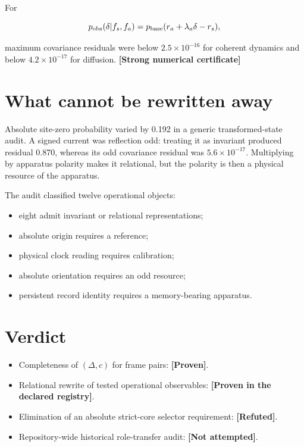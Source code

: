 \documentclass[11pt,a4paper,openany]{report}
\newcommand{\statusProven}{\textcolor{fingreen}{[Proven]}}
\newcommand{\statusRefuted}{\textcolor{finred}{[Refuted]}}
\begin{document}
For

\[
p_{\rm obs}(\delta|f_s,f_a)
=p_{\rm base}(r_a+\lambda_a\delta-r_s),
\]

maximum covariance residuals were below \(2.5\times10^{-16}\) for coherent dynamics and below \(4.2\times10^{-17}\) for diffusion. \textbf{[Strong numerical certificate]}

\section{What cannot be rewritten away}

Absolute site-zero probability varied by 0.192 in a generic transformed-state audit. A signed current was reflection odd: treating it as invariant produced residual 0.870, whereas its odd covariance residual was \(5.6\times10^{-17}\). Multiplying by apparatus polarity makes it relational, but the polarity is then a physical resource of the apparatus.

The audit classified twelve operational objects:

\begin{itemize}
\item 
eight admit invariant or relational representations;

\item 
absolute origin requires a reference;

\item 
physical clock reading requires calibration;

\item 
absolute orientation requires an odd resource;

\item 
persistent record identity requires a memory-bearing apparatus.

\end{itemize}

\section{Verdict}

\begin{itemize}
\item 
Completeness of \((\Delta,c)\) for frame pairs: \textbf{\statusProven{}}.

\item 
Relational rewrite of tested operational observables: \textbf{[Proven in the declared registry]}.

\item 
Elimination of an absolute strict-core selector requirement: \textbf{\statusRefuted{}}.

\item 
Repository-wide historical role-transfer audit: \textbf{[Not attempted]}.

\end{itemize}
\end{document}
